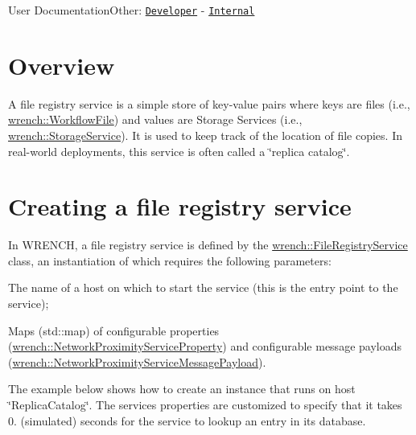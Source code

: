 User DocumentationOther\+: \href{../developer/guide-fileregistry.html}{\tt Developer} -\/ \href{../internal/guide-fileregistry.html}{\tt Internal}\hypertarget{guide-fileregistry_guide-fileregistry-overview}{}\section{Overview}\label{guide-fileregistry_guide-fileregistry-overview}
A file registry service is a simple store of key-\/value pairs where keys are files (i.\+e., {\ttfamily \hyperlink{classwrench_1_1_workflow_file}{wrench\+::\+Workflow\+File}}) and values are Storage Services (i.\+e., {\ttfamily \hyperlink{classwrench_1_1_storage_service}{wrench\+::\+Storage\+Service}}). It is used to keep track of the location of file copies. In real-\/world deployments, this service is often called a \char`\"{}replica catalog\char`\"{}.\hypertarget{guide-fileregistry_guide-fileregistry-creating}{}\section{Creating a file registry service}\label{guide-fileregistry_guide-fileregistry-creating}
In W\+R\+E\+N\+CH, a file registry service is defined by the {\ttfamily \hyperlink{classwrench_1_1_file_registry_service}{wrench\+::\+File\+Registry\+Service}} class, an instantiation of which requires the following parameters\+:


\begin{DoxyItemize}
\item The name of a host on which to start the service (this is the entry point to the service);
\item Maps ({\ttfamily std\+::map}) of configurable properties ({\ttfamily \hyperlink{classwrench_1_1_network_proximity_service_property}{wrench\+::\+Network\+Proximity\+Service\+Property}}) and configurable message payloads ({\ttfamily \hyperlink{classwrench_1_1_network_proximity_service_message_payload}{wrench\+::\+Network\+Proximity\+Service\+Message\+Payload}}).
\end{DoxyItemize}

The example below shows how to create an instance that runs on host \char`\"{}\+Replica\+Catalog\char`\"{}. The service\textquotesingle{}s properties are customized to specify that it takes 0. (simulated) seconds for the service to lookup an entry in its database.


